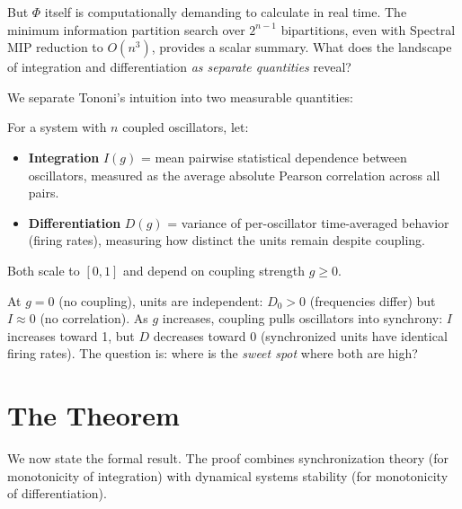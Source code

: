 But $\Phi$ itself is computationally demanding to calculate in real time. The minimum information partition search over $2^{n-1}$ bipartitions, even with Spectral MIP reduction to $O(n^3)$, provides a scalar summary. What does the landscape of integration and differentiation \textit{as separate quantities} reveal?

We separate Tononi's intuition into two measurable quantities:

\begin{definition}
\label{def:id-metrics}
For a system with $n$ coupled oscillators, let:

\begin{itemize}
  \item \textbf{Integration} $I(g)$ = mean pairwise statistical dependence between oscillators, measured as the average absolute Pearson correlation across all pairs.
  \item \textbf{Differentiation} $D(g)$ = variance of per-oscillator time-averaged behavior (firing rates), measuring how distinct the units remain despite coupling.
\end{itemize}

Both scale to $[0, 1]$ and depend on coupling strength $g \geq 0$.
\end{definition}

At $g = 0$ (no coupling), units are independent: $D_0 > 0$ (frequencies differ) but $I \approx 0$ (no correlation). As $g$ increases, coupling pulls oscillators into synchrony: $I$ increases toward 1, but $D$ decreases toward 0 (synchronized units have identical firing rates). The question is: where is the \textit{sweet spot} where both are high?

\section{The Theorem}

We now state the formal result. The proof combines synchronization theory (for monotonicity of integration) with dynamical systems stability (for monotonicity of differentiation).

